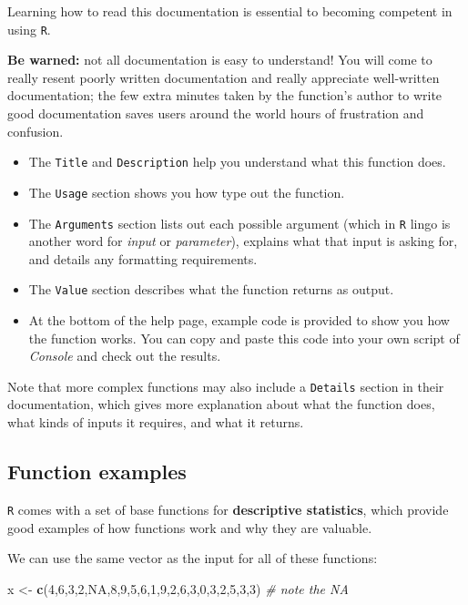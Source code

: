\documentclass[]{book}
\newenvironment{Shaded}{\begin{snugshade}}{\end{snugshade}}
\newcommand{\CommentTok}[1]{\textcolor[rgb]{0.56,0.35,0.01}{\textit{#1}}}
\newcommand{\DecValTok}[1]{\textcolor[rgb]{0.00,0.00,0.81}{#1}}
\newcommand{\KeywordTok}[1]{\textcolor[rgb]{0.13,0.29,0.53}{\textbf{#1}}}
\newcommand{\NormalTok}[1]{#1}
\newcommand{\OtherTok}[1]{\textcolor[rgb]{0.56,0.35,0.01}{#1}}
\newcommand{\StringTok}[1]{\textcolor[rgb]{0.31,0.60,0.02}{#1}}
\begin{document}
Learning how to read this documentation is essential to becoming competent in using \texttt{R}.

\textbf{Be warned:} not all documentation is easy to understand! You will come to really resent poorly written documentation and really appreciate well-written documentation; the few extra minutes taken by the function's author to write good documentation saves users around the world hours of frustration and confusion.

\begin{itemize}
\item
  The \texttt{Title} and \texttt{Description} help you understand what this function does.
\item
  The \texttt{Usage} section shows you how type out the function.
\item
  The \texttt{Arguments} section lists out each possible argument (which in \texttt{R} lingo is another word for \emph{input} or \emph{parameter}), explains what that input is asking for, and details any formatting requirements.
\item
  The \texttt{Value} section describes what the function returns as output.
\item
  At the bottom of the help page, example code is provided to show you how the function works. You can copy and paste this code into your own script of \emph{Console} and check out the results.
\end{itemize}

Note that more complex functions may also include a \texttt{Details} section in their documentation, which gives more explanation about what the function does, what kinds of inputs it requires, and what it returns.

\hypertarget{function-examples}{%
\subsection*{Function examples}\label{function-examples}}

\texttt{R} comes with a set of base functions for \textbf{descriptive statistics}, which provide good examples of how functions work and why they are valuable.

We can use the same vector as the input for all of these functions:

\begin{Shaded}
\begin{Highlighting}[]
\NormalTok{x <-}\StringTok{ }\KeywordTok{c}\NormalTok{(}\DecValTok{4}\NormalTok{,}\DecValTok{6}\NormalTok{,}\DecValTok{3}\NormalTok{,}\DecValTok{2}\NormalTok{,}\OtherTok{NA}\NormalTok{,}\DecValTok{8}\NormalTok{,}\DecValTok{9}\NormalTok{,}\DecValTok{5}\NormalTok{,}\DecValTok{6}\NormalTok{,}\DecValTok{1}\NormalTok{,}\DecValTok{9}\NormalTok{,}\DecValTok{2}\NormalTok{,}\DecValTok{6}\NormalTok{,}\DecValTok{3}\NormalTok{,}\DecValTok{0}\NormalTok{,}\DecValTok{3}\NormalTok{,}\DecValTok{2}\NormalTok{,}\DecValTok{5}\NormalTok{,}\DecValTok{3}\NormalTok{,}\DecValTok{3}\NormalTok{)  }\CommentTok{# note the NA}
\end{Highlighting}
\end{Shaded}
\end{document}
